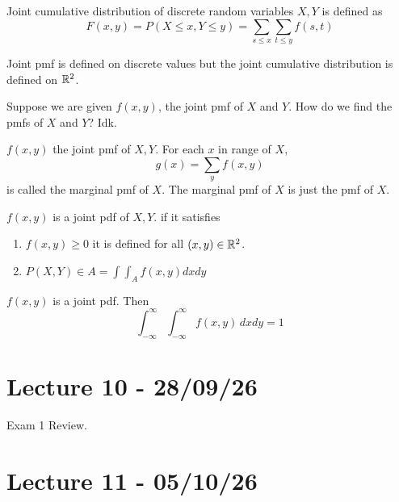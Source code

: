 \documentclass[11pt]{article}
\begin{document}
\begin{definition}
    Joint cumulative distribution of discrete random variables $X,Y$ is defined as
    \[
        F(x,y) = P(X \le x, Y \le y) = \sum_{s\le x} \sum_{t \le y}f(s,t)
    \]
\end{definition}
\begin{remark}
    Joint pmf is defined on discrete values but the joint cumulative distribution is defined on $\mathbb{R}^2$.
\end{remark}
Suppose we are given $f(x,y)$, the joint pmf of $X$ and $Y$. How do we find the pmfs of $X$ and $Y$? Idk.
\begin{definition}
    $f(x,y)$ the joint pmf of $X,Y$. For each $x$ in range of $X$, 
    \[
        g(x) = \sum_{y} f(x,y)
    \]
    is called the marginal pmf of $X$. The marginal pmf of $X$ is just the pmf of $X$.
    
\end{definition}
\begin{definition}
    $f(x,y)$ is a joint pdf of $X, Y$. if it satisfies
    \begin{enumerate}
        \item $f(x,y) \ge 0$ it is defined for all $(x,y) \in \mathbb{R}^2$.
        \item $P(X,Y) \in A = \int \int_A f(x,y)dxdy$
    \end{enumerate}
    
\end{definition}

\begin{theorem}
    $f(x,y)$ is a joint pdf. Then
    \[
        \int_{-\infty}^{\infty} \int_{-\infty}^{\infty} f(x,y)\, dxdy = 1
    \]
    
\end{theorem}

\section{Lecture 10 - 28/09/26}
Exam 1 Review.

\section{Lecture 11 - 05/10/26}
\end{document}
